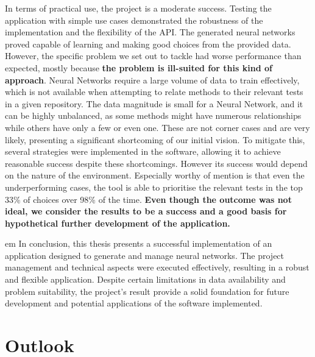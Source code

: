 \documentclass[a4paper, 11pt]{report}
\begin{document}
    In terms of practical use, the project is a moderate success. Testing the application with simple use cases demonstrated the robustness of the implementation and the flexibility of the API. The generated neural networks proved capable of learning and making good choices from the provided data. However, the specific problem we set out to tackle had worse performance than expected, mostly because \textbf{the problem is ill-suited for this kind of approach}. Neural Networks require a large volume of data to train effectively, which is not available when attempting to relate methods to their relevant tests in a given repository. The data magnitude is small for a Neural Network, and it can be highly unbalanced, as some methods might have numerous relationships while others have only a few or even one. These are not corner cases and are very likely, presenting a significant shortcoming of our initial vision. To mitigate this, several strategies were implemented in the software, allowing it to achieve reasonable success despite these shortcomings. However its success would depend on the nature of the environment. Especially worthy of mention is that even the underperforming cases, the tool is able to prioritise the relevant tests in the top 33\% of choices over 98\% of the time. \textbf{Even though the outcome was not ideal, we consider the results to be a success and a good basis for hypothetical further development of the application.}

    \begin{tcolorbox}[colback=white]
     em
    In conclusion, this thesis presents a successful implementation of an application designed to generate and manage neural networks. The project management and technical aspects were executed effectively, resulting in a robust and flexible application. Despite certain limitations in data availability and problem suitability, the project's result provide a solid foundation for future development and potential applications of the software implemented.
    \end{tcolorbox}

    \section{Outlook}
\end{document}
